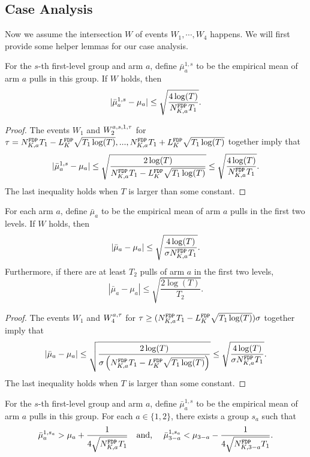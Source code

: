 \subsection{Case Analysis}
Now we assume the intersection $W$ of events $W_1,\cdots,W_4$ happens. We will
first provide some helper lemmas for our case analysis.

\begin{lemma}
  For the $s$-th first-level group and arm $a$, define
  $\bar{\mu}_a^{1,s}$ to be the empirical mean of arm $a$ pulls in
  this group. If $W$ holds, then
  \[
    |\bar{\mu}_a^{1,s} - \mu_a| \leq \sqrt{\frac{4\log(T)}{\fdpN T_1}}.
  \]
\end{lemma}

\begin{proof}
  The events $W_1$ and $W_2^{a,s,1,\z}$ for
  $\z = \fdpN T_1- \GdT \sqrt{T_1\log(T)},...,\fdpN T_1 + \GdT
  \sqrt{T_1\log(T)}$ together imply that
\[
|\bar{\mu}_a^{1,s} - \mu_a| \leq \sqrt{\frac{2\log(T)}{\fdpN T_1- \GdT \sqrt{T_1\log(T)}}} \leq \sqrt{\frac{4\log(T)}{\fdpN T_1}}.
\]
The last inequality holds when $T$ is larger than some constant.
\end{proof}


\begin{lemma}
  For each arm $a$, define $\bar{\mu}_a$ to be the empirical mean of
  arm $a$ pulls in the first two levels. If $W$ holds, then
  \[
    |\bar{\mu}_a - \mu_a| \leq \sqrt{\frac{4\log(T)}{\NG \fdpN T_1}} .
  \]
Furthermore, if there are at least $T_2$ pulls of arm $a$ in the first two levels,
\[
|\bar{\mu}_a-\mu_a| \leq \sqrt{\frac{2\log(T)}{T_2}}.
\]
\end{lemma}

\begin{proof}
The events $W_1$ and $W_4^{a,\z}$ for $\z \geq  (\fdpN T_1- \GdT \sqrt{T_1\log(T)})\NG$ together imply that
  \[
    |\bar{\mu}_a - \mu_a| \leq \sqrt{\frac{2\log(T)}{\NG\left(\fdpN T_1- \GdT \sqrt{T_1\log(T)}\right)}} \leq \sqrt{\frac{4\log(T)}{\NG \fdpN T_1}} .
\]
The last inequality holds when $T$ is larger than some constant.
\end{proof}


\begin{lemma}\label{lem:luck}
  For the $s$-th first-level group and arm $a$, define
  $\bar{\mu}_a^{1,s}$ to be the empirical mean of arm $a$ pulls in
  this group. For each $a \in \{1,2\}$, there exists a group $s_a$
  such that
\[
\bar{\mu}_a ^{1,s_a} > \mu_a + \frac{1}{4\sqrt{\fdpN T_1}} \quad \mbox{and, } \quad
\bar{\mu}_{3-a} ^{1,s_a} < \mu_{3-a}   - \frac{1}{4\sqrt{\fdpN[3-a] T_1}}.
\]
\end{lemma}





